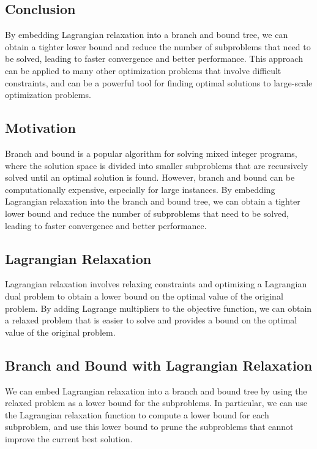 \subsection{Conclusion}

By embedding Lagrangian relaxation into a branch and bound tree, we can obtain a tighter lower bound and reduce the number of subproblems that need to be solved, leading to faster convergence and better performance. This approach can be applied to many other optimization problems that involve difficult constraints, and can be a powerful tool for finding optimal solutions to large-scale optimization problems.



\subsection{Motivation}

Branch and bound is a popular algorithm for solving mixed integer programs, where the solution space is divided into smaller subproblems that are recursively solved until an optimal solution is found. However, branch and bound can be computationally expensive, especially for large instances. By embedding Lagrangian relaxation into the branch and bound tree, we can obtain a tighter lower bound and reduce the number of subproblems that need to be solved, leading to faster convergence and better performance.

\subsection{Lagrangian Relaxation}

Lagrangian relaxation involves relaxing constraints and optimizing a Lagrangian dual problem to obtain a lower bound on the optimal value of the original problem. By adding Lagrange multipliers to the objective function, we can obtain a relaxed problem that is easier to solve and provides a bound on the optimal value of the original problem.

\subsection{Branch and Bound with Lagrangian Relaxation}

We can embed Lagrangian relaxation into a branch and bound tree by using the relaxed problem as a lower bound for the subproblems. In particular, we can use the Lagrangian relaxation function to compute a lower bound for each subproblem, and use this lower bound to prune the subproblems that cannot improve the current best solution.

